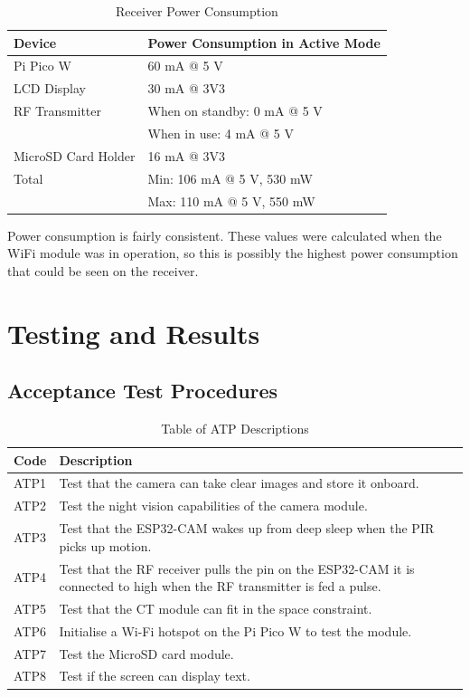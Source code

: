 \documentclass[class=report,11pt,crop=false]{standalone}
\begin{document}
\begin{table}[h]
\centering
\begin{tabular}{|l|l|}
\hline
\textbf{Device} & \textbf{Power Consumption in Active Mode} \\
\hline
Pi Pico W & 60 mA @ 5 V \\
\hline
LCD Display & 30 mA @ 3V3 \\
\hline
RF Transmitter & When on standby: 0 mA @ 5 V \\
& When in use: 4 mA @ 5 V \\
\hline
MicroSD Card Holder & 16 mA @ 3V3 \\
\hline
Total & Min: 106 mA @ 5 V, 530 mW \\
& Max: 110 mA @ 5 V, 550 mW \\
\hline
\end{tabular}
\caption{Receiver Power Consumption}
\label{tab:R_PWR}
\end{table}

Power consumption is fairly consistent. These values were calculated when the WiFi module was in operation, so this is possibly the highest power consumption that could be seen on the receiver. 

\section{Testing and Results} \label{sc: HW_TR}
\subsection{Acceptance Test Procedures}

\begin{table}[h]
\centering
\begin{tabular}{|p{1cm}|p{15cm}|}
\hline
\textbf{Code} & \textbf{Description} \\
\hline
ATP1 & Test that the camera can take clear images and store it onboard.\\
\hline
ATP2 & Test the night vision capabilities of the camera module. \\
\hline
ATP3 & Test that the ESP32-CAM wakes up from deep sleep when the PIR picks up motion. \\ 
\hline
ATP4 & Test that the RF receiver pulls the pin on the ESP32-CAM it is connected to high when the RF transmitter is fed a pulse.\\ 
\hline
ATP5 & Test that the CT module can fit in the space constraint. \\
\hline
ATP6 & Initialise a Wi-Fi hotspot on the Pi Pico W to test the module. \\ 
\hline
ATP7 & Test the MicroSD card module.\\ 
\hline
ATP8 & Test if the screen can display text. \\ 
\hline
\end{tabular}
\caption{Table of ATP Descriptions}
\label{tab:ATPs_Criteria}
\end{table}
\end{document}
